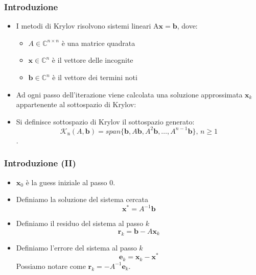 \documentclass[10pt]{beamer}
\begin{document}
\begin{frame} \frametitle{Introduzione}
\begin{itemize}
    \item I metodi di Krylov risolvono sistemi lineari A$\mathbf{x}=\mathbf{b}$, dove:
    \begin{itemize}
    \item $A\in\mathbb{C}^{n\times n}$ è una matrice quadrata
    \item $\mathbf{x}\in\mathbb{C}^{n}$ è il vettore delle incognite
    \item $\mathbf{b}\in\mathbb{C}^{n}$ è il vettore dei termini noti
    \end{itemize}
    \item Ad ogni passo dell'iterazione viene calcolata una soluzione approssimata $\mathbf{x}_k$ appartenente al sottospazio di Krylov:
    \item Si definisce \alert{sottospazio di Krylov} il sottospazio generato:
    $$
    \mathcal{K}_\mathrm{n}(A,\mathbf{b})=span\{\mathbf{b},A\mathbf{b},A^2\mathbf{b},\dots,A^{n-1}\mathbf{b}\}\text{, } n\geq1
    $$.
    
\end{itemize}
\end{frame} 

\begin{frame} \frametitle{Introduzione (II)}
\begin{itemize}
    \item $\mathbf{x}_0$ è la \alert{guess} iniziale al passo $0$.
    \item Definiamo la \alert{soluzione} del sistema cercata $$\mathbf{x}^*=A^{-1}\mathbf{b}$$
    \item Definiamo il \alert{residuo} del sistema al passo $k$
    $$\mathbf{r}_k =\mathbf{b}-A\mathbf{x}_k$$
    \item Definiamo l'\alert{errore} del sistema al passo $k$
    $$\mathbf{e}_k =\mathbf{x}_k-\mathbf{x}^*$$
    Possiamo notare come $\mathbf{r}_k=-A^{-1}\mathbf{e}_k$.
\end{itemize}
\end{frame} 
\end{document}
